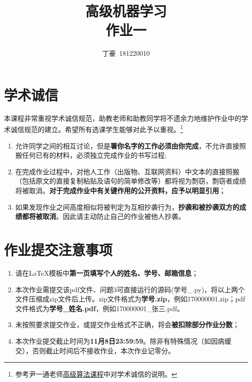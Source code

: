 \documentclass[a4paper,UTF8]{article}
\numberwithin{equation}{section}
\begin{document}
\title{高级机器学习\\
作业一}
\author{丁豪\, 181220010} 
\maketitle

\section*{学术诚信}

本课程非常重视学术诚信规范，助教老师和助教同学将不遗余力地维护作业中的学术诚信规范的建立。希望所有选课学生能够对此予以重视。\footnote{参考尹一通老师\href{http://tcs.nju.edu.cn/wiki/}{高级算法课程}中对学术诚信的说明。}

\begin{tcolorbox}
	\begin{enumerate}
		\item[(1)] 允许同学之间的相互讨论，但是{\color{red}\textbf{署你名字的工作必须由你完成}}，不允许直接照搬任何已有的材料，必须独立完成作业的书写过程;
		\item[(2)] 在完成作业过程中，对他人工作（出版物、互联网资料）中文本的直接照搬（包括原文的直接复制粘贴及语句的简单修改等）都将视为剽窃，剽窃者成绩将被取消。{\color{red}\textbf{对于完成作业中有关键作用的公开资料，应予以明显引用}}；
		\item[(3)] 如果发现作业之间高度相似将被判定为互相抄袭行为，{\color{red}\textbf{抄袭和被抄袭双方的成绩都将被取消}}。因此请主动防止自己的作业被他人抄袭。
	\end{enumerate}
\end{tcolorbox}

\section*{作业提交注意事项}
\begin{tcolorbox}
	\begin{enumerate}
		\item[(1)] 请在LaTeX模板中{\color{red}\textbf{第一页填写个人的姓名、学号、邮箱信息}}；
		\item[(2)] 本次作业需提交该pdf文件、问题3可直接运行的源码(学号\_.py)，将以上两个文件压缩成zip文件后上传。zip文件格式为{\color{red}\textbf{学号.zip}}，例如170000001.zip；pdf文件格式为{\color{red}\textbf{学号\_姓名.pdf}}，例如170000001\_张三.pdf。
		\item[(3)] 未按照要求提交作业，或提交作业格式不正确，将会{\color{red}\textbf{被扣除部分作业分数}}；
		\item[(4)] 本次作业提交截止时间为{\color{red}\textbf{11月8日23:59:59}}。除非有特殊情况（如因病缓交），否则截止时间后不接收作业，本次作业记零分。
	\end{enumerate}
\end{tcolorbox}
\end{document}
